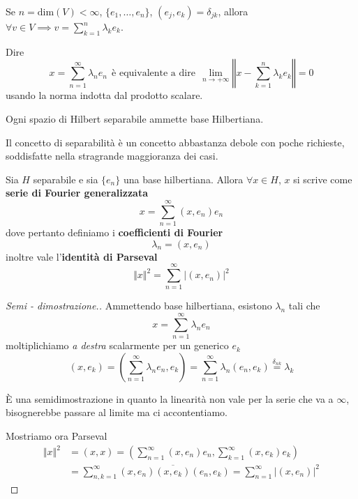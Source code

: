 \begin{rem}
Se $n = \mathrm{dim}(V) < \infty $, $\{e_{1}, \dotsc, e_{n}\}$, $(e_{j}, e_{k}) = \delta_{jk}$, allora $\forall v\in V\implies v = \sum^{n}_{k = 1} \lambda_{k} e_{k}$.
\end{rem}
\begin{rem}
Dire
\begin{equation*}
x = \sum^{\infty}_{n = 1} \lambda_{n} e_{n} \ \ \text{è equivalente a dire} \ \ \lim\limits_{n\rightarrow + \infty}\left \Vert x - \sum^{n}_{k = 1} \lambda_{k} e_{k}\right \Vert = 0
\end{equation*}
usando la norma indotta dal prodotto scalare.
\end{rem}
\begin{thm}
Ogni spazio di Hilbert separabile ammette base Hilbertiana.
\end{thm}
\begin{rem}
Il concetto di separabilità è un concetto abbastanza debole con poche richieste, soddisfatte nella stragrande maggioranza dei casi.
\end{rem}
\begin{thm}
Sia $H$ separabile e sia $\{e_{n}\}$ una base hilbertiana. Allora $\forall x\in H$, $x$ si scrive come \textbf{serie di Fourier generalizzata}
\begin{equation*}
x = \sum^{\infty}_{n = 1}(x, e_{n}) e_{n}
\end{equation*}
dove pertanto definiamo i \textbf{coefficienti di Fourier}
\begin{equation*}
\lambda_{n} = (x, e_{n})
\end{equation*}
inoltre vale l'\textbf{identità di Parseval}
\begin{equation*}
\Vert x \Vert^{2} = \sum\limits^{\infty}_{n = 1}| (x, e_{n})|^{2}
\end{equation*}
\end{thm}
\begin{proof}[Semi - dimostrazione.]

Ammettendo base hilbertiana, esistono $\lambda_{n}$ tali che
\begin{equation*}
x = \sum^{\infty}_{n = 1} \lambda_{n} e_{n}
\end{equation*}
moltiplichiamo \textit{a destra} scalarmente per un generico $e_{k}$
\begin{equation*}
(x, e_{k}) = \left(\sum^{\infty}_{n = 1} \lambda_{n} e_{n}, e_{k}\right) = \sum^{\infty}_{n = 1} \lambda_{n}(e_{n}, e_{k})\overset{\delta_{nk}}{=} \lambda_{k}
\end{equation*}
\begin{rem}
È una semidimostrazione in quanto la linearità non vale per la serie che va a $\infty $, bisognerebbe passare al limite ma ci accontentiamo.
\end{rem}
Mostriamo ora Parseval
\begin{align*}
\Vert x \Vert^{2} & = (x, x) = \left(\sum^{\infty}_{n = 1}(x, e_{n}) e_{n}, \sum^{\infty}_{k = 1}(x, e_{k}) e_{k}\right)\\
 & = \sum\limits^{\infty}_{n, k = 1}(x, e_{n})\overline{(x, e_{k})}(e_{n}, e_{k}) = \sum\limits^{\infty}_{n = 1}| (x, e_{n})|^{2}
\end{align*}
\end{proof}
